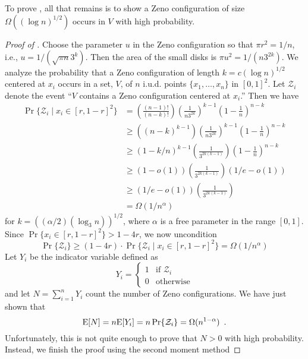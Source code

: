 \documentclass{patmorin}
\begin{document}
To prove , all that remains is to show a Zeno
configuration of size $\Omega((\log n)^{1/2})$ occurs in $V$ with high
probability.

\begin{proof}[Proof of ]
Choose the parameter $u$ in the Zeno configuration so that $\pi r^2=1/n$,
i.e., $u=1/(\sqrt{\pi n}3^k)$.  Then the area of the small disks is
$\pi u^2=1/(n3^{2k})$.
We analyze the probability that a Zeno configuration of length $k=c(\log
n)^{1/2}$ centered at $x_i$ occurs in a set, $V$, of $n$ i.u.d. points
$\{x_1,\ldots,x_n\}$ in
$[0,1]^2$.  Let $\mathcal{Z}_i$ denote the event ``$V$
contains a Zeno configuration centered at $x_i$.''  Then we have
\begin{align*}
 \Pr\{\mathcal{Z}_i\mid x_i\in[r,1-r]^2\} 
  & = \left(\frac{(n-1)!}{(n-k)!}\right) %
      \left(\frac{1}{n3^{2k}}\right)^{k-1}   %
      \left(1-\frac{1}{n}\right)^{n-k}   \\ %
  & \ge
      \left((n-k)^{k-1}\right) 
      \left(\frac{1}{n3^{2k}}\right)^{k-1}  
      \left(1-\frac{1}{n}\right)^{n-k}   \\ 
  & \ge 
      (1-k/n)^{k-1} %
      \left(\frac{1}{3^{2k(k-1)}}\right)
      \left(1-\frac{1}{n}\right)^{n-k} \\
  & \ge
      \left(1-o(1)\right) 
      \left(\frac{1}{3^{2k(k-1)}}\right)
      \left(1/e-o(1)\right)   \\ 
  & \ge (1/e-o(1)) \left(\frac{1}{3^{2k(k-1)}}\right) \\
  & = \Omega(1/n^{\alpha})
\end{align*}
for $k=((\alpha/2)(\log_3 n))^{1/2}$, where $\alpha$ is a free parameter
in the range $[0,1]$.  Since $\Pr\{x_i\in[r,1-r]^2\} > 1-4r$, we now
uncondition
\[
 \Pr\{\mathcal{Z}_i\} \ge  
    (1-4r)\cdot\Pr\{\mathcal{Z}_i\mid x_i\in[r,1-r]^2\}
    = \Omega(1/n^{\alpha})
\]
Let $Y_i$ be the indicator variable defined as
\[
   Y_i = \begin{cases} 1 & \text{if $\mathcal{Z}_i$} \\
                       0 & \text{otherwise} 
         \end{cases}
\]
and let $N=\sum_{i=1}^n Y_i$ count the number of Zeno configurations.  We
have just shown that 
\[
   \mathrm{E}[N] = n\mathrm{E}[Y_i] = n\Pr\{\mathcal{Z}_i\}=\Omega(n^{1-\alpha}) \enspace .
\]
Unfortunately, this is not quite enough to prove that $N>0$ with high
probability.  Instead, we finish the proof using the second moment method

\end{proof}
\end{document}
